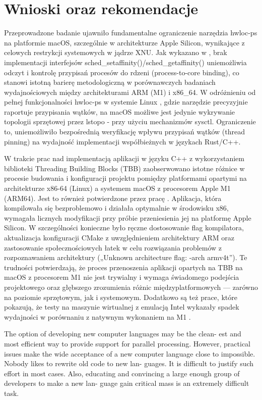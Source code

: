 \chapter{Wnioski oraz rekomendacje}
Przeprowadzone badanie ujawniło fundamentalne ograniczenie narzędzia hwloc-ps na platformie macOS, szczególnie w architekturze Apple Silicon, wynikające z celowych restrykcji systemowych w jądrze XNU. Jak wykazano w \cite{HWLOC555}, brak implementacji interfejsów sched\_setaffinity()/sched\_getaffinity() uniemożliwia odczyt i kontrolę przypisań procesów do rdzeni (process-to-core binding), co stanowi istotną barierę metodologiczną w porównawczych badaniach wydajnościowych między architekturami ARM (M1) i x86\_64. W odróżnieniu od pełnej funkcjonalności hwloc-ps w systemie Linux \cite{hwlocHardwareLocality}, gdzie narzędzie precyzyjnie raportuje przypisania wątków, na macOS możliwe jest jedynie wykrywanie topologii sprzętowej przez lstopo - przy użyciu mechanizmów sysctl. Ograniczenie to, uniemożliwiło bezpośrednią weryfikację wpływu przypisań wątków (thread pinning) na wydajność implementacji współbieżnych w językach Rust/C++.

W trakcie prac nad implementacją aplikacji w języku C++ z wykorzystaniem biblioteki Threading Building Blocks (TBB) zaobserwowano istotne różnice w procesie budowania i konfiguracji projektu pomiędzy platformami opartymi na architekturze x86-64 (Linux) a systemem macOS z procesorem Apple M1 (ARM64). Jest to również potwierdzone przez pracę \cite{ARMTBB}. Aplikacja, która kompilowała się bezproblemowo i działała optymalnie w środowisku x86, wymagała licznych modyfikacji przy próbie przeniesienia jej na platformę Apple Silicon. W szczególności konieczne było ręczne dostosowanie flag kompilatora, aktualizacja konfiguracji CMake z uwzględnieniem architektury ARM oraz zastosowanie społecznościowych łatek w celu rozwiązania problemów z rozpoznawaniem architektury („Unknown architecture flag: -arch armv4t”). Te trudności potwierdzają, że proces przenoszenia aplikacji opartych na TBB na macOS z procesorem M1 nie jest trywialny i wymaga świadomego podejścia projektowego oraz głębszego zrozumienia różnic międzyplatformowych — zarówno na poziomie sprzętowym, jak i systemowym. Dodatkowo są też prace, które pokazują, że testy na maszynie wirtualnej z emulacją Intel wykazały spadek wydajności w porównaniu z natywnym wykonaniem na M1 \cite{TBBARMCONCLUSIONS}.



The option of developing new computer languages may be the clean- est and most efficient way to provide support for parallel processing. However, practical issues make the wide acceptance of a new computer language close to impossible. Nobody likes to rewrite old code to new lan- guages. It is difficult to justify such effort in most cases. Also, educating and convincing a large enough group of developers to make a new lan- guage gain critical mass is an extremely difficult task.